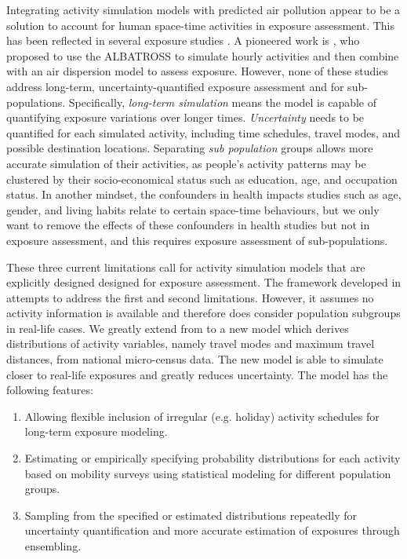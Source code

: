 \documentclass[]{article}
\begin{document}
Integrating activity simulation models with predicted air pollution appear to be a solution to account for human space-time activities in exposure assessment. This has been reflected in several exposure studies \citep{shekarrizfard2017regional,deffner2016personal,gulliver2005time,dons2011impact}. A pioneered work is \cite{beckx2009dynamic}, who proposed to use the ALBATROSS to simulate hourly activities and then combine with an air dispersion model to assess exposure. However, none of these studies address long-term, uncertainty-quantified exposure assessment and for sub-populations. Specifically, \textit{long-term simulation} means the model is capable of quantifying exposure variations over longer times. \textit{Uncertainty} needs to be quantified for each simulated activity, including time schedules, travel modes, and possible destination locations. Separating \textit{sub population} groups allows more accurate simulation of their activities, as people's activity patterns may be clustered by their socio-economical status such as education, age, and occupation status. In another mindset, the confounders in health impacts studies such as age, gender, and living habits relate to certain space-time behaviours, but we only want to remove the effects of these confounders in health studies but not in exposure assessment, and this requires exposure assessment of sub-populations.  

These three current limitations call for activity simulation models that are explicitly designed designed for exposure assessment. The framework developed in \cite{lu2019activity} attempts to address the first and second limitations. However, it assumes no activity information is available and therefore does consider population subgroups in real-life cases. We greatly extend from \cite{lu2019activity} to a new model which derives distributions of activity variables, namely travel modes and maximum travel distances, from national micro-census data. The new model is able to simulate closer to real-life exposures and greatly reduces uncertainty. The model has the following features: 

\begin{enumerate}
    \item Allowing flexible inclusion of irregular (e.g. holiday) activity schedules for long-term exposure modeling. 
    
    
    \item Estimating or empirically specifying probability distributions for each activity based on  mobility surveys using statistical modeling for different population groups. 
    
    \item Sampling from the specified or estimated distributions repeatedly for uncertainty quantification and more accurate estimation of exposures through ensembling. 
    
         
\end{enumerate}
\end{document}
